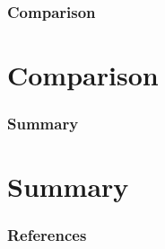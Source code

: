 \documentclass[30pt]{beamer}
\begin{document}
\begin{frame}
\frametitle{Comparison}
\section{Comparison}
\end{frame}

\begin{frame}
\frametitle{Summary}
\section{Summary}
\end{frame}

\begin{frame}
\frametitle{References}


\end{frame}
\end{document}
